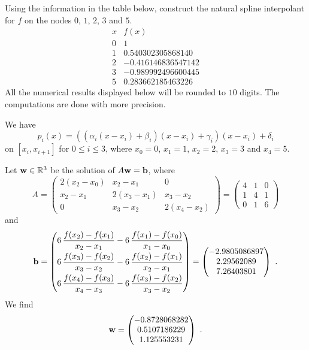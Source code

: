 \begin{egg}
Using the information in the table below, construct the natural spline
interpolant for $f$ on the nodes $0$, $1$, $2$, $3$ and $5$.
\[
\begin{array}{c|c}
x & f(x) \\
\hline
0 & 1 \\
1 & 0.540302305868140 \\
2 & -0.416146836547142 \\
3 & -0.989992496600445 \\
5 & 0.283662185463226
\end{array}
\]
All the numerical results displayed below will be rounded to $10$
digits.  The computations are done with more precision.

We have
\[
p_i(x) = \left(\left(\alpha_i(x-x_i) + \beta_i\right)(x-x_i)
+\gamma_i\right)(x-x_i) + \delta_i
\]
on $[x_i,x_{i+1}]$ for $0\leq i \leq 3$, where $x_0=0$, $x_1=1$,
$x_2=2$, $x_3=3$ and $x_4=5$.

Let $\mathbf{w} \in \mathbb{R}^3$ be the solution of $A\mathbf{w} = \mathbf{b}$, where
\[
A = \begin{pmatrix}
2 (x_2-x_0) & x_2-x_1 & 0 \\
x_2-x_1 & 2(x_3-x_1) & x_3-x_2 \\
0 & x_3-x_2 & 2(x_4-x_2)
\end{pmatrix}
= \begin{pmatrix}
4 & 1 & 0 \\
1 & 4 & 1 \\
0 & 1 & 6
\end{pmatrix}
\]
and
\[
\mathbf{b} = \begin{pmatrix}
\displaystyle 6\,\frac{f(x_2) - f(x_1)}{x_2-x_1} -
6\,\frac{f(x_1) - f(x_0)}{x_1-x_0} \\[0.8em]
\displaystyle 6\,\frac{f(x_3) - f(x_2)}{x_3-x_2} -
6\,\frac{f(x_2) - f(x_1)}{x_2-x_1} \\[0.8em]
\displaystyle 6\,\frac{f(x_4) - f(x_3)}{x_4-x_3} -
6\,\frac{f(x_3) - f(x_2)}{x_3-x_2}
\end{pmatrix}
= \begin{pmatrix}
-2.9805086897 \\
2.29562089 \\
7.26403801
\end{pmatrix} \ .
\]
We find
\[
\mathbf{w} = \begin{pmatrix}
-0.8728068282 \\ 0.5107186229 \\ 1.125553231
\end{pmatrix} \ .
\]


\end{egg}
